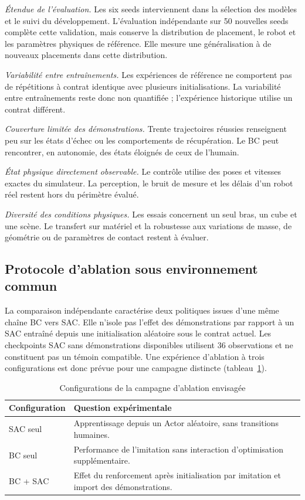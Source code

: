 \documentclass[conference,a4paper]{IEEEtran}
\begin{document}
\textit{Étendue de l'évaluation.} Les six seeds interviennent dans la sélection des modèles et le suivi du développement. L'évaluation indépendante sur 50 nouvelles seeds complète cette validation, mais conserve la distribution de placement, le robot et les paramètres physiques de référence. Elle mesure une généralisation à de nouveaux placements dans cette distribution.

\textit{Variabilité entre entraînements.} Les expériences de référence ne comportent pas de répétitions à contrat identique avec plusieurs initialisations. La variabilité entre entraînements reste donc non quantifiée ; l'expérience historique utilise un contrat différent.

\textit{Couverture limitée des démonstrations.} Trente trajectoires réussies renseignent peu sur les états d'échec ou les comportements de récupération. Le BC peut rencontrer, en autonomie, des états éloignés de ceux de l'humain.

\textit{État physique directement observable.} Le contrôle utilise des poses et vitesses exactes du simulateur. La perception, le bruit de mesure et les délais d'un robot réel restent hors du périmètre évalué.

\textit{Diversité des conditions physiques.} Les essais concernent un seul bras, un cube et une scène. Le transfert sur matériel et la robustesse aux variations de masse, de géométrie ou de paramètres de contact restent à évaluer.

\subsection{Protocole d'ablation sous environnement commun}
La comparaison indépendante caractérise deux politiques issues d'une même chaîne BC vers SAC. Elle n'isole pas l'effet des démonstrations par rapport à un SAC entraîné depuis une initialisation aléatoire sous le contrat actuel. Les checkpoints SAC sans démonstrations disponibles utilisent 36 observations et ne constituent pas un témoin compatible. Une expérience d'ablation à trois configurations est donc prévue pour une campagne distincte (tableau~\ref{tab:ablation}).

\begin{table}[t]
\caption{Configurations de la campagne d'ablation envisagée}
\label{tab:ablation}
\centering\small
\begin{tabularx}{\columnwidth}{lX}
\toprule
Configuration & Question expérimentale \\
\midrule
SAC seul & Apprentissage depuis un Actor aléatoire, sans transitions humaines. \\
BC seul & Performance de l'imitation sans interaction d'optimisation supplémentaire. \\
BC + SAC & Effet du renforcement après initialisation par imitation et import des démonstrations. \\
\bottomrule
\end{tabularx}
\end{table}
\end{document}
